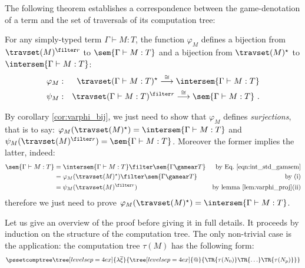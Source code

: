The following theorem establishes a correspondence between the
game-denotation of a term and the set of traversals of its
computation tree:
\begin{theorem}
\label{thm:correspondence}
 For any simply-typed term $\Gamma \vdash M :T$,
the function $\varphi_M$ defines a bijection from $\travset(M)^{\filter
r}$ to $\sem{\Gamma \vdash M : T}$ and a bijection from
$\travset(M)^\star$ to $\intersem{\Gamma \vdash M : T}$:
\begin{eqnarray*}
 \varphi_M  &:& \travset(\Gamma \vdash M : T)^\star \stackrel{\cong}{\longrightarrow} \intersem{\Gamma \vdash M :T} \\
 \psi_M  &:& \travset(\Gamma \vdash M : T)^{\filter r} \stackrel{\cong}{\longrightarrow} \sem{\Gamma \vdash M :T} \ .
\end{eqnarray*}

\end{theorem}

\begin{remark}
\label{rem:corresp_proofreduction}
    By corollary \ref{cor:varphi_bij}, we just need to show that
    $\varphi_M$ defines \emph{surjections}, that is to
    say: $\varphi_M(\travset(M)^\star) = \intersem{\Gamma \vdash M : T}$
    and $\psi_M(\travset(M)^{\filter r}) = \sem{\Gamma \vdash M : T}$.
    Moreover the former implies the latter, indeed:
    \begin{align*}
    \sem{\Gamma \vdash M : T} &= \intersem{\Gamma \vdash M : T} \filter \sem{\Gamma \gamear T} & \mbox{by Eq.\ \ref{eqn:int_std_gamsem}} \\
            &= \varphi_M(\travset(M)^\star) \filter \sem{\Gamma \gamear T} & \mbox{by (i)}\\
            &= \psi_M(\travset(M)^{\filter r}) & \mbox{by lemma \ref{lem:varphi_proj}(ii)}
    \end{align*}
    therefore we just need to prove $\varphi_M(\travset(M)^\star) = \intersem{\Gamma \vdash M : T}$.
\end{remark}
\smallskip

    Let us give an overview of the proof before giving it in full details.
    It proceeds by induction on the structure of the computation tree.
    The only non-trivial case is the application: the computation tree
    $\tau(M)$ has the following form:
        $$ \pssetcomptree\tree[levelsep=4ex]{\lambda \overline{\xi}}
            { \tree[levelsep=4ex]{@}
                {   \TR{\tau(N_0)} \TR{\ldots} \TR{\tau(N_p)}}}
        $$

